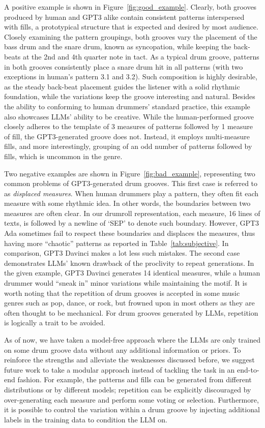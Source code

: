\documentclass[letterpaper]{article} %
\begin{document}
A positive example is shown in Figure~\ref{fig:good_example}. Clearly, both grooves produced by human and GPT3 alike contain consistent patterns interspersed with fills, a prototypical structure that is expected and desired by most audience. Closely examining the pattern groupings, both grooves vary the placement of the bass drum and the snare drum, known as syncopation, while keeping the back-beats at the 2nd and 4th quarter note in tact. As a typical drum groove, patterns in both grooves consistently place a snare drum hit in all patterns (with two exceptions in human's pattern 3.1 and 3.2). Such composition is highly desirable, as the steady back-beat placement guides the listener with a solid rhythmic foundation, while the variations keep the groove interesting and natural. Besides the ability to conforming to human drummers' standard practice, this example also showcases LLMs' ability to be creative. While the human-performed groove closely adheres to the template of 3 measures of patterns followed by 1 measure of fill, the GPT3-generated groove does not. Instead, it employs multi-measure fills, and more interestingly, grouping of an odd number of patterns followed by fills, which is uncommon in the genre.

Two negative examples are shown in Figure~\ref{fig:bad_example}, representing two common problems of GPT3-generated drum grooves. This first case is referred to as \textit{displaced measures}. When human drummers play a pattern, they often fit each measure with some rhythmic idea. In other words, the boundaries between two measures are often clear. In our drumroll representation, each measure, 16 lines of texts, is followed by a newline of `SEP' to denote such boundary. However, GPT3 Ada sometimes fail to respect these boundaries and displaces the measures, thus having more ``chaotic'' patterns as reported in Table~\ref{tab:subjective}. In comparison, GPT3 Davinci makes a lot less such mistakes. The second case demonstrates LLMs' known drawback of the proclivity to repeat generations. In the given example, GPT3 Davinci generates 14 identical measures, while a human drummer would ``sneak in'' minor variations while maintaining the motif. It is worth noting that the repetition of drum grooves is accepted in some music genres such as pop, dance, or rock, but frowned upon in most others as they are often thought to be mechanical. For drum grooves generated by LLMs, repetition is logically a trait to be avoided.

As of now, we have taken a model-free approach where the LLMs are only trained on some drum groove data without any additional information or priors. To reinforce the strengths and alleviate the weaknesses discussed before, we suggest future work to take a modular approach instead of tackling the task in an end-to-end fashion. For example, the patterns and fills can be generated from different distributions or by different models; repetition can be explicitly discouraged by over-generating each measure and perform some voting or selection. Furthermore, it is possible to control the variation within a drum groove by injecting additional labels in the training data to condition the LLM on.
\end{document}
